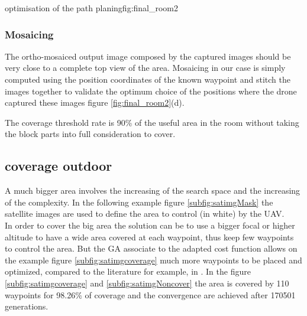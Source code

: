  \begin{mfigures}[!]{optimisation of the path planing}{fig:final_room2} \centering
{}
\hspace{1cm}
\end{mfigures} 

 
 \subsubsection{Mosaicing }

The ortho-mosaiced output image composed by the captured
images should be very close to a complete top view of the area.
Mosaicing in our case is simply computed using the position coordinates of the known waypoint and stitch the images together to validate the optimum choice of the positions where the drone captured these images figure \ref{fig:final_room2}(d).

The coverage threshold rate is 90\% of the useful area in the room without taking the block parts into full consideration to cover.
 
 

\subsection{coverage outdoor}\label{coverageOutDoor}
 A much bigger area involves the increasing of the search space and the increasing of the complexity. 
In the following example figure \ref{subfig:satimgMask} the satellite images are used to define the area to control (in white)  by the UAV. \\
In order to cover the big area the solution can be to use a bigger focal or higher altitude to have a wide area covered at each waypoint, thus keep few waypoints to control the area. But the GA associate to the adapted cost function allows on the example figure \ref{subfig:satimgcoverage} much more waypoints to be placed and optimized, compared to the literature for example, in \cite{c10,c11}. In the figure \ref{subfig:satimgcoverage} and \ref{subfig:satimgNoncover} the area is covered by 110 waypoints for 98.26$\%$ of coverage and the convergence are achieved after 170501 generations.\\



